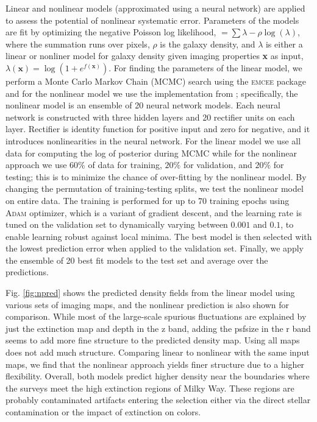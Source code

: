 Linear and nonlinear models (approximated using a neural network) are applied to assess the potential of nonlinear systematic error. Parameters of the models are fit by optimizing the negative Poisson log likelihood, $= \sum \lambda - \rho \log(\lambda)$, where the summation runs over pixels, $\rho$ is the galaxy density, and $\lambda$ is either a linear or nonliner model for galaxy density given imaging properties \textbf{x} as input, $\lambda(\textbf{x}) = \log (1+e^{f(\textbf{x})})$. For finding the parameters of the linear model, we perform a Monte Carlo Markov Chain (MCMC) search using the \textsc{emcee} package  and for the nonlinear model we use the implementation from \cite{rezaie2021primordial}; specifically, the nonlinear model is an ensemble of 20 neural network models. Each neural network is constructed with three hidden layers and 20 rectifier units on each layer. Rectifier is identity function for positive input and zero for negative, and it introduces nonlinearities in the neural network. For the linear model we use all data for computing the log of posterior during MCMC while for the nonlinear approach we use $60\%$ of data for training, $20\%$ for validation, and $20\%$ for testing; this is to minimize the chance of over-fitting by the nonlinear model. By changing the permutation of training-testing splits, we test the nonlinear model on entire data. The training is performed for up to 70 training epochs using \textsc{Adam} optimizer, which is a variant of gradient descent, and the learning rate is tuned on the validation set to dynamically varying between $0.001$ and $0.1$, to enable learning robust against local minima. The best model is then selected with the lowest prediction error when applied to the validation set. Finally, we apply the ensemble of 20 best fit models to the test set and average over the predictions. 

Fig. \ref{fig:npred} shows the predicted density fields from the linear model using various sets of imaging maps, and the nonlinear prediction is also shown for comparison. While most of the large-scale spurious fluctuations are explained by just the extinction map and depth in the z band, adding the psfsize in the r band seems to add more fine structure to the predicted density map. Using all maps does not add much structure. Comparing linear to nonlinear with the same input maps, we find that the nonlinear approach yields finer structure due to a higher flexibility.  Overall, both models predict higher density near the boundaries where the surveys meet the high extinction regions of Milky Way. These regions are probably contaminated artifacts entering the selection either via the direct stellar contamination or the impact of extinction on colors.

